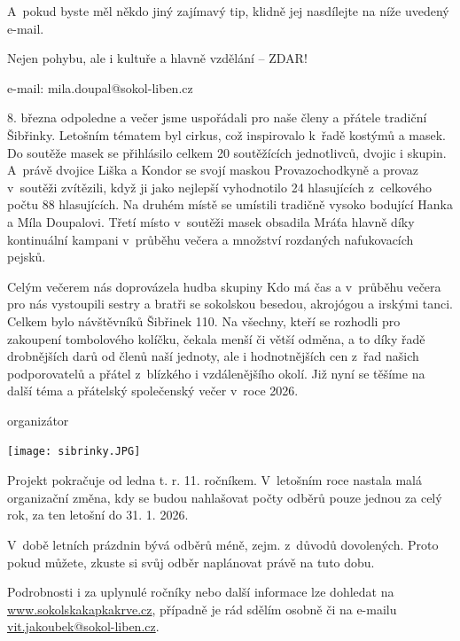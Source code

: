 \documentclass[11pt]{article}
\begin{document}
A~pokud byste měl někdo jiný zajímavý tip, klidně jej nasdílejte na níže
uvedený e-mail.

Nejen pohybu, ale i kultuře a hlavně vzdělání -- ZDAR!

\signature{Miloslav Doupal}{e-mail: mila.doupal@sokol-liben.cz}

8. března odpoledne a večer jsme uspořádali pro naše členy a přátele
tradiční Šibřinky. Letošním tématem byl cirkus, což inspirovalo k~řadě
kostýmů a masek. Do soutěže masek se přihlásilo celkem 20 soutěžících
jednotlivců, dvojic i skupin. A~právě dvojice Liška a Kondor se svojí
maskou Provazochodkyně a provaz v~soutěži zvítězili, když ji jako
nejlepší vyhodnotilo 24 hlasujících z~celkového počtu 88 hlasujících. Na
druhém místě se umístili tradičně vysoko bodující Hanka a Míla
Doupalovi. Třetí místo v~soutěži masek obsadila Mráťa hlavně díky
kontinuální kampani v~průběhu večera a množství rozdaných nafukovacích
pejsků.

Celým večerem nás doprovázela hudba skupiny Kdo má čas a v~průběhu
večera pro nás vystoupili sestry a bratři se sokolskou besedou,
akrojógou a irskými tanci. Celkem bylo návštěvníků Šibřinek 110. Na
všechny, kteří se rozhodli pro zakoupení tombolového kolíčku, čekala
menší či větší odměna, a to díky řadě drobnějších darů od členů naší
jednoty, ale i hodnotnějších cen z~řad našich podporovatelů a přátel
z~blízkého i vzdálenějšího okolí. Již nyní se těšíme na další téma a
přátelský společenský večer v~roce 2026.

\signature{Tomáš Dragoun}{organizátor}

\begin{center}
\texttt{[image: sibrinky.JPG]}
\end{center}

\clearpage
{}

Projekt pokračuje od ledna t. r. 11. ročníkem. V~letošním roce nastala
malá organizační změna, kdy se budou nahlašovat počty odběrů pouze
jednou za celý rok, za ten letošní do 31. 1. 2026.

V~době letních prázdnin bývá odběrů méně, zejm. z~důvodů dovolených.
Proto pokud můžete, zkuste si svůj odběr naplánovat právě na tuto dobu.

Podrobnosti i za uplynulé ročníky nebo další informace lze dohledat na
\href{http://www.sokolsakapkakrve.cz}{www.sokolskakapkakrve.cz},
případně je rád sdělím osobně či na e-mailu
\href{mailto:vit.jakoubek@sokol-liben.cz}{vit.jakoubek@sokol-liben.cz}.
\end{document}
